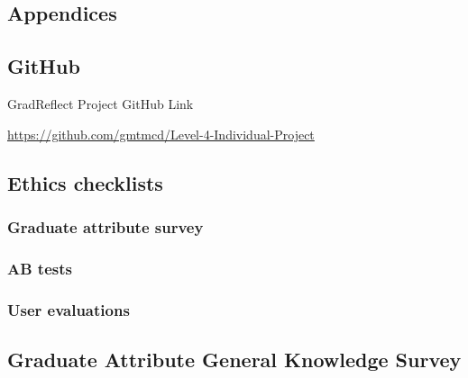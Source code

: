 \documentclass{l4proj}
\begin{document}
\begin{appendices}

\chapter{Appendices}

\section{GitHub}\label{AppendixGitHub}

GradReflect Project GitHub Link

\url{https://github.com/gmtmcd/Level-4-Individual-Project}

%

\section{Ethics checklists}

\subsection{Graduate attribute survey}



\subsection{AB tests}



\subsection{User evaluations}



%

\section{Graduate Attribute General Knowledge Survey} \label{Appendix-gradAttributeSurvey}


\end{appendices}
\end{document}
